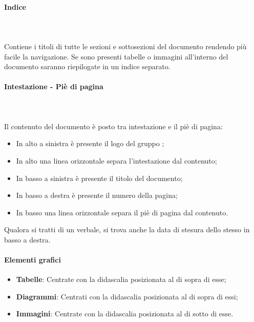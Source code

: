 \paragraph{Indice}\mbox{} \\ \\
Contiene i titoli di tutte le sezioni e sottosezioni del documento rendendo più facile la navigazione.
Se sono presenti tabelle o immagini all'interno del documento saranno riepilogate in un indice separato.

\paragraph{Intestazione - Piè di pagina} \mbox{} \\ \\
Il contenuto del documento è posto tra intestazione e il piè di pagina:

\begin{itemize}
\item In alto a sinistra è presente il logo del gruppo \Gruppo{};
\item In alto una linea orizzontale separa l’intestazione dal contenuto;
\item In basso a sinistra è presente il titolo del documento;
\item In basso a destra è presente il numero della pagina;
\item In basso una linea orizzontale separa il piè di pagina dal contenuto.
\end{itemize}
Qualora si tratti di un verbale, si trova anche la data di stesura dello stesso in basso a destra.

\paragraph{Elementi grafici}\mbox{}
\begin{itemize}
\item \textbf{Tabelle}: Centrate con la didascalia posizionata al di sopra di esse;
\item \textbf{Diagrammi}: Centrati con la didascalia posizionata al di sopra di essi;
\item \textbf{Immagini}: Centrate con la didascalia posizionata al di sotto di esse.
\end{itemize}

